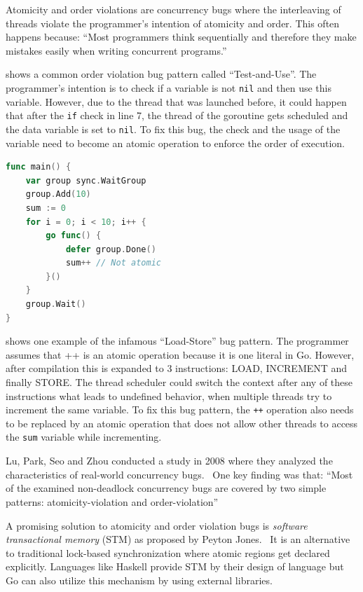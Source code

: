 \documentclass[conference]{IEEEtran}
\begin{document}
Atomicity and order violations are concurrency bugs where the interleaving of threads violate the programmer's intention of atomicity and order.
This often happens because:
``Most programmers think sequentially and therefore they make mistakes easily when writing concurrent programs.''~\cite{lu2008mistakes}

 shows a common order violation bug pattern called ``Test-and-Use''.
The programmer's intention is to check if a variable is not \lstinline{nil} and then use this variable.
However, due to the thread that was launched before, it could happen that after the \lstinline{if} check in line 7, the thread of the goroutine gets scheduled and the data variable is set to \lstinline{nil}.
To fix this bug, the check and the usage of the variable need to become an atomic operation to enforce the order of execution.

\begin{lstlisting}[float=h, language=Go, label=lst:atomicity, caption=Load-Store bug pattern -- Atomicity violation]
func main() {
    var group sync.WaitGroup
    group.Add(10)
    sum := 0
    for i = 0; i < 10; i++ {
        go func() {
            defer group.Done()
            sum++ // Not atomic
        }()
    }
    group.Wait()
}
\end{lstlisting}

 shows one example of the infamous ``Load-Store'' bug pattern.
The programmer assumes that ++ is an atomic operation because it is one literal in Go.
However, after compilation this is expanded to 3 instructions: LOAD, INCREMENT and finally STORE.
The thread scheduler could switch the context after any of these instructions what leads to undefined behavior, when multiple threads try to increment the same variable.
To fix this bug pattern, the \lstinline{++} operation also needs to be replaced by an atomic operation that does not allow other threads to access the \lstinline{sum} variable while incrementing.

Lu, Park, Seo and Zhou conducted a study in 2008 where they analyzed the characteristics of real-world concurrency bugs.~\cite{lu2008mistakes}
One key finding was that:
``Most of the examined non-deadlock concurrency bugs are covered by two simple patterns: atomicity-violation and order-violation''~\cite{lu2008mistakes}

A promising solution to atomicity and order violation bugs is \emph{software transactional memory} (STM) as proposed by Peyton Jones.~\cite{peytonjones2007beautiful}
It is an alternative to traditional lock-based synchronization where atomic regions get declared explicitly.
Languages like Haskell provide STM by their design of language but Go can also utilize this mechanism by using external libraries.
\end{document}
